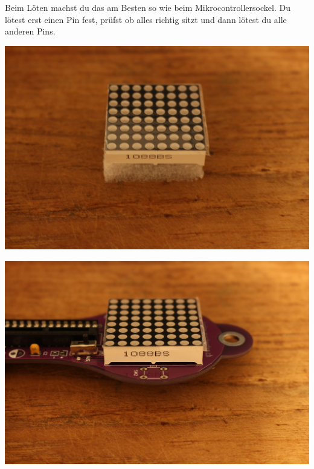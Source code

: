 \documentclass{article}
\begin{document}
Beim Löten machst du das am Besten so wie beim Mikrocontrollersockel. Du lötest erst einen Pin fest, prüfst ob alles richtig sitzt und dann lötest du alle anderen Pins.

\vspace{1cm}

\begin{minipage}[b]{0.5\textwidth}
	\includegraphics[width=\textwidth]{Bilder2024/IMG_0062.JPG}
\end{minipage}
\begin{minipage}[b]{0.5\textwidth}
	\includegraphics[width=\textwidth]{Bilder2024/IMG_0063.JPG}
\end{minipage}

\vspace{0.5cm}
\end{document}
